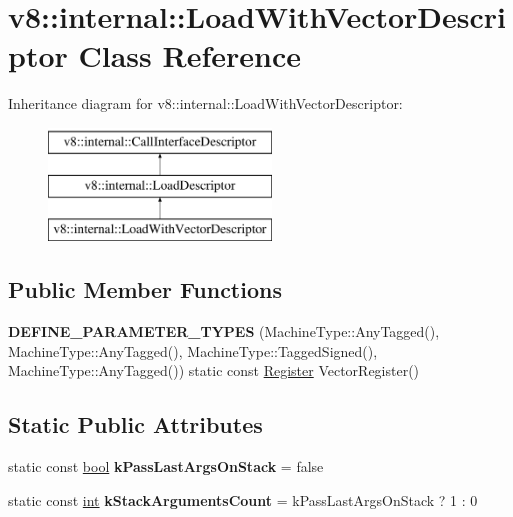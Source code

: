 \hypertarget{classv8_1_1internal_1_1LoadWithVectorDescriptor}{}\section{v8\+:\+:internal\+:\+:Load\+With\+Vector\+Descriptor Class Reference}
\label{classv8_1_1internal_1_1LoadWithVectorDescriptor}
Inheritance diagram for v8\+:\+:internal\+:\+:Load\+With\+Vector\+Descriptor\+:\begin{figure}[H]
\begin{center}
\leavevmode
\includegraphics[height=3.000000cm]{classv8_1_1internal_1_1LoadWithVectorDescriptor}
\end{center}
\end{figure}
\subsection*{Public Member Functions}
\begin{DoxyCompactItemize}
\item 
\mbox{\label{classv8_1_1internal_1_1LoadWithVectorDescriptor_a04181c4e54ca49c851f6f8a6ef57b782}} 
{\bfseries D\+E\+F\+I\+N\+E\+\_\+\+P\+A\+R\+A\+M\+E\+T\+E\+R\+\_\+\+T\+Y\+P\+ES} (Machine\+Type\+::\+Any\+Tagged(), Machine\+Type\+::\+Any\+Tagged(), Machine\+Type\+::\+Tagged\+Signed(), Machine\+Type\+::\+Any\+Tagged()) static const \mbox{\hyperlink{classv8_1_1internal_1_1Register}{Register}} Vector\+Register()
\end{DoxyCompactItemize}
\subsection*{Static Public Attributes}
\begin{DoxyCompactItemize}
\item 
\mbox{\label{classv8_1_1internal_1_1LoadWithVectorDescriptor_a1897414dd81425ddd8e4b822c1d10b5b}} 
static const \mbox{\hyperlink{classbool}{bool}} {\bfseries k\+Pass\+Last\+Args\+On\+Stack} = false
\item 
\mbox{\label{classv8_1_1internal_1_1LoadWithVectorDescriptor_ae709aac9d8b801d58e401c2eed519d4d}} 
static const \mbox{\hyperlink{classint}{int}} {\bfseries k\+Stack\+Arguments\+Count} = k\+Pass\+Last\+Args\+On\+Stack ? 1 \+: 0
\end{DoxyCompactItemize}
